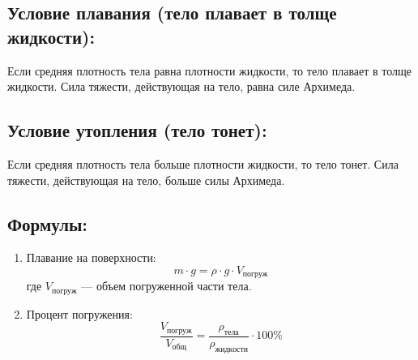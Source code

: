 \documentclass[a4paper,12pt]{article}
\begin{document}
\vspace{-9pt}
\subsection*{Условие плавания (тело плавает в толще жидкости):}
\vspace{-3pt}
Если средняя плотность тела равна плотности жидкости, то тело плавает в толще жидкости. Сила тяжести, действующая на тело, равна силе Архимеда.

\vspace{-9pt}
\subsection*{Условие утопления (тело тонет):}
\vspace{-3pt}
Если средняя плотность тела больше плотности жидкости, то тело тонет. Сила тяжести, действующая на тело, больше силы Архимеда.

\vspace{-9pt}
\subsection*{Формулы:}
\vspace{-3pt}
\begin{enumerate}[itemsep=0pt, topsep=0pt, parsep=2pt]
  \item Плавание на поверхности:
    \vspace{-0.05em}
    $$ m \cdot g = \rho \cdot g \cdot V_{погруж} $$
    где $V_{погруж}$ — объем погруженной части тела.
  \item Процент погружения:
    \vspace{-0.05em}
    $$ \frac{V_{погруж}}{V_{общ}} = \frac{\rho_{тела}}{\rho_{жидкости}} \cdot 100\% $$
\end{enumerate}
\end{document}

